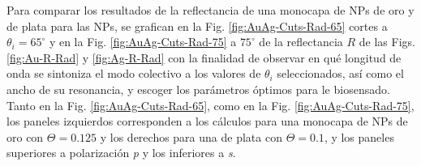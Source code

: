 Para comparar los resultados de la reflectancia de una monocapa de NPs de oro y de  plata para las NPs, se grafican en la Fig. \ref{fig:AuAg-Cuts-Rad-65} cortes a $\theta_i = 65^\circ$  y en la  Fig.  \ref{fig:AuAg-Cuts-Rad-75} a $75^\circ$ de la reflectancia $R$ de las Figs. \ref{fig:Au-R-Rad} y \ref{fig:Ag-R-Rad} con la finalidad de observar en qué longitud de onda se sintoniza el modo colectivo a los valores de $\theta_i$ seleccionados, así como el ancho de su resonancia, y escoger los parámetros óptimos para le biosensado. Tanto en la Fig. \ref{fig:AuAg-Cuts-Rad-65}, como en la Fig. \ref{fig:AuAg-Cuts-Rad-75}, los paneles izquierdos corresponden a los cálculos para una monocapa de NPs de oro con $\Theta=0.125$ y los derechos para una de plata con $\Theta=0.1$, y los paneles superiores a polarización \emph{p} y los inferiores a \emph{s}.

